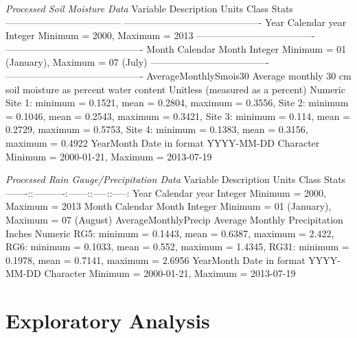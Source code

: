 \documentclass[
  12pt,
]{article}
\begin{document}
\emph{Processed Soil Moisture Data} \textbar Variable \textbar{}
Description \textbar{} Units \textbar{} Class \textbar{} Stats
\textbar{} \textbar---------------\textbar---------------\textbar------
\textbar------------\textbar-------------------------------\textbar{}
\textbar Year \textbar{} Calendar year \textbar{} \textbar Integer
\textbar{} Minimum = 2000, Maximum = 2013\textbar{}
\textbar---------------\textbar---------------\textbar-------\textbar------------\textbar-------------------------------\textbar{}
\textbar Month \textbar Calendar Month \textbar{} \textbar Integer
\textbar Minimum = 01 (January), \textbar{} \textbar{} \textbar{}
\textbar{} \textbar{} \textbar Maximum = 07 (July) \textbar{}
\textbar---------------\textbar---------------\textbar-------\textbar------------\textbar-------------------------------\textbar{}
AverageMonthlySmois30\textbar{} Average monthly 30 cm soil moisture as
percent water content \textbar{} Unitless (measured as a percent)
\textbar{} Numeric \textbar{} Site 1: minimum = 0.1521, mean = 0.2804,
maximum = 0.3556, Site 2: minimum = 0.1046, mean = 0.2543, maximum =
0.3421, Site 3: minimum = 0.114, mean = 0.2729, maximum = 0.5753, Site
4: minimum = 0.1383, mean = 0.3156, maximum = 0.4922 \textbar{}
\textbar YearMonth\textbar{} Date in format YYYY-MM-DD \textbar{}
\textbar{} Character \textbar{} Minimum = 2000-01-21, Maximum =
2013-07-19\textbar{}

\emph{Processed Rain Gauge/Precipitation Data} \textbar Variable
\textbar{} Description \textbar{} Units \textbar{} Class \textbar{}
Stats
\textbar-------:\textbar:----------:\textbar------:\textbar:-----:\textbar:-----:\textbar{}
\textbar Year\textbar{} Calendar year \textbar{} \textbar{} Integer
\textbar{} Minimum = 2000, Maximum = 2013\textbar{}
\textbar Month\textbar{} Calendar Month \textbar{} \textbar{} Integer
\textbar{} Minimum = 01 (January), Maximum = 07 (August)\textbar{}
\textbar AverageMonthlyPrecip\textbar{} Average Monthly Precipitation
\textbar{} Inches \textbar{} Numeric \textbar{} RG5: minimum = 0.1443,
mean = 0.6387, maximum = 2.422, RG6: minimum = 0.1033, mean = 0.552,
maximum = 1.4345, RG31: minimum = 0.1978, mean = 0.7141, maximum =
2.6956 \textbar{} \textbar YearMonth\textbar{} Date in format YYYY-MM-DD
\textbar{} \textbar{} Character \textbar{} Minimum = 2000-01-21, Maximum
= 2013-07-19\textbar{}

\newpage

\hypertarget{exploratory-analysis}{%
\section{Exploratory Analysis}\label{exploratory-analysis}}
\end{document}
